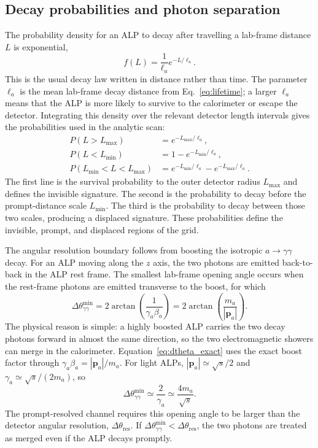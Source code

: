 \documentclass[12pt,a4paper]{article}
\newcommand{\ma}{m_a}
\newcommand{\sqrts}{\sqrt{s}}
\begin{document}
\subsection{Decay probabilities and photon separation}

The probability density for an ALP to decay after travelling a lab-frame
distance $L$ is exponential,
\begin{equation}
    f(L)=\frac{1}{\ell_a}e^{-L/\ell_a}.
\end{equation}
This is the usual decay law written in distance rather than time. The parameter
$\ell_a$ is the mean lab-frame decay distance from Eq.~\eqref{eq:lifetime}; a
larger $\ell_a$ means that the ALP is more likely to survive to the calorimeter
or escape the detector. Integrating this density over the relevant detector
length intervals gives the probabilities used in the analytic scan:
\begin{align}
    P(L>L_\mathrm{max})
    &=
    e^{-L_\mathrm{max}/\ell_a},
    \label{eq:survival_prob}\\
    P(L<L_\mathrm{min})
    &=
    1-e^{-L_\mathrm{min}/\ell_a},\\
    P(L_\mathrm{min}<L<L_\mathrm{max})
    &=
    e^{-L_\mathrm{min}/\ell_a}
    -
    e^{-L_\mathrm{max}/\ell_a}.
    \label{eq:decay_window_prob}
\end{align}
The first line is the survival probability to the outer detector radius
$L_\mathrm{max}$ and defines the invisible signature. The second is the
probability to decay before the prompt-distance scale $L_\mathrm{min}$. The
third is the probability to decay between those two scales, producing a
displaced signature. These probabilities define the invisible, prompt, and
displaced regions of the grid.

The angular resolution boundary follows from boosting the isotropic
$a\to\gamma\gamma$ decay. For an ALP moving along the $z$ axis, the two photons
are emitted back-to-back in the ALP rest frame. The smallest lab-frame opening
angle occurs when the rest-frame photons are emitted transverse to the boost,
for which
\begin{equation}
    \Delta\theta_{\gamma\gamma}^{\min}
    =
    2\arctan\!\left(\frac{1}{\gamma_a\beta_a}\right)
    =
    2\arctan\!\left(\frac{\ma}{|\mathbf{p}_a|}\right).
    \label{eq:dtheta_exact}
\end{equation}
The physical reason is simple: a highly boosted ALP carries the two decay
photons forward in almost the same direction, so the two electromagnetic
showers can merge in the calorimeter. Equation~\eqref{eq:dtheta_exact} uses the
exact boost factor through $\gamma_a\beta_a=|\mathbf{p}_a|/\ma$.
For light ALPs, $|\mathbf{p}_a|\simeq\sqrts/2$ and
$\gamma_a\simeq\sqrts/(2\ma)$, so
\begin{equation}
    \Delta\theta_{\gamma\gamma}^{\min}
    \simeq
    \frac{2}{\gamma_a}
    \simeq
    \frac{4\ma}{\sqrts}.
    \label{eq:dtheta}
\end{equation}
The prompt-resolved channel requires this opening angle to be larger than the
detector angular resolution, $\Delta\theta_\mathrm{res}$. If
$\Delta\theta_{\gamma\gamma}^{\min}<\Delta\theta_\mathrm{res}$, the two photons
are treated as merged even if the ALP decays promptly.
\end{document}
